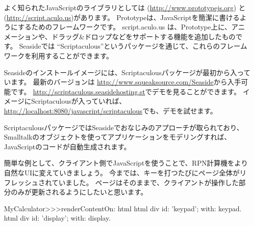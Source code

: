 \documentclass[a4paper,10pt,twoside]{book}
\begin{document}
よく知られたJavaScriptのライブラリとしては  (\url{http://www.prototypejs.org}) と  (\url{http://script.aculo.us})があります。
Prototypeは、JavaScriptを簡潔に書けるようにするためのフレームワークです。
script.aculo.us は、Prototype上に、アニメーションや、ドラッグ\&ドロップなどをサポートする機能を追加したものです。
Seasideでは ``Scriptaculous''というパッケージを通じて、これらのフレームワークを利用することができます。

Seasideのインストールイメージには、Scriptaculousパッケージが最初から入っています。
最新のバージョンは \url{http://www.squeaksource.com/Seaside}から入手可能です。
\url{http://scriptaculous.seasidehosting.st}でデモを見ることができます。
イメージにScriptaculousが入っていれば、\url{http://localhost:8080/javascript/scriptaculous}でも、デモを試せます。

ScriptaculousパッケージではSeasideでおなじみのアプローチが取られており、Smalltalkのオブジェクトを使ってアプリケーションをモデリングすれば、JavaScriptのコードが自動生成されます。

簡単な例として、クライアント側でJavaScriptを使うことで、RPN計算機をより自然なUIに変えていきましょう。
今までは、キーを打つたびにページ全体がリフレッシュされていました。
ページはそのままで、クライアントが操作した部分のみが更新されるようにしたいと思います。


\begin{code}{}
MyCalculator>>>renderContentOn: html
	html div id: 'keypad'; with: keypad.
	html div id: 'display'; with: display.	
\end{code}

\end{document}

